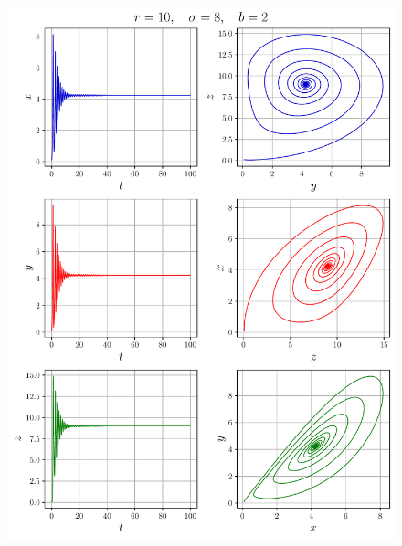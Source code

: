 \documentclass[12pt,a4paper]{article}
\begin{document}
	\begin{figure}
		\centering
		\includegraphics{fig/lorenz2}
	\end{figure}
\end{document}
